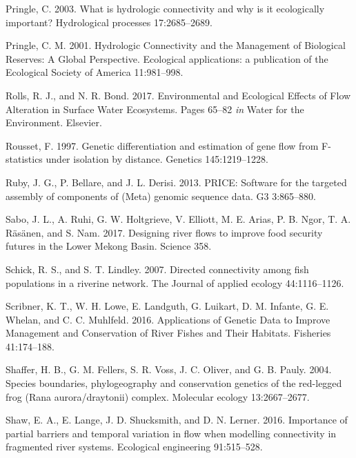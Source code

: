 \documentclass[proquest,12pt,final]{ucthesis-CA2012} %
\begin{document}
\begin{ucmainmatter}
\leavevmode\hypertarget{ref-pringle_what_2003}{}%
Pringle, C. 2003. What is hydrologic connectivity and why is it
ecologically important? Hydrological processes 17:2685--2689.

\leavevmode\hypertarget{ref-pringle_hydrologic_2001}{}%
Pringle, C. M. 2001. Hydrologic Connectivity and the Management of
Biological Reserves: A Global Perspective. Ecological applications: a
publication of the Ecological Society of America 11:981--998.

\leavevmode\hypertarget{ref-rolls_environmental_2017}{}%
Rolls, R. J., and N. R. Bond. 2017. Environmental and Ecological Effects
of Flow Alteration in Surface Water Ecosystems. Pages 65--82 \emph{in}
Water for the Environment. Elsevier.

\leavevmode\hypertarget{ref-rousset_genetic_1997}{}%
Rousset, F. 1997. Genetic differentiation and estimation of gene flow
from F-statistics under isolation by distance. Genetics 145:1219--1228.

\leavevmode\hypertarget{ref-ruby_price_2013}{}%
Ruby, J. G., P. Bellare, and J. L. Derisi. 2013. PRICE: Software for the
targeted assembly of components of (Meta) genomic sequence data. G3
3:865--880.

\leavevmode\hypertarget{ref-sabo_designing_2017}{}%
Sabo, J. L., A. Ruhi, G. W. Holtgrieve, V. Elliott, M. E. Arias, P. B.
Ngor, T. A. Räsänen, and S. Nam. 2017. Designing river flows to improve
food security futures in the Lower Mekong Basin. Science 358.

\leavevmode\hypertarget{ref-schick_directed_2007}{}%
Schick, R. S., and S. T. Lindley. 2007. Directed connectivity among fish
populations in a riverine network. The Journal of applied ecology
44:1116--1126.

\leavevmode\hypertarget{ref-scribner_applications_2016}{}%
Scribner, K. T., W. H. Lowe, E. Landguth, G. Luikart, D. M. Infante, G.
E. Whelan, and C. C. Muhlfeld. 2016. Applications of Genetic Data to
Improve Management and Conservation of River Fishes and Their Habitats.
Fisheries 41:174--188.

\leavevmode\hypertarget{ref-shaffer_species_2004}{}%
Shaffer, H. B., G. M. Fellers, S. R. Voss, J. C. Oliver, and G. B.
Pauly. 2004. Species boundaries, phylogeography and conservation
genetics of the red-legged frog (Rana aurora/draytonii) complex.
Molecular ecology 13:2667--2677.

\leavevmode\hypertarget{ref-shaw_importance_2016}{}%
Shaw, E. A., E. Lange, J. D. Shucksmith, and D. N. Lerner. 2016.
Importance of partial barriers and temporal variation in flow when
modelling connectivity in fragmented river systems. Ecological
engineering 91:515--528.


\end{ucmainmatter}
\end{document}

